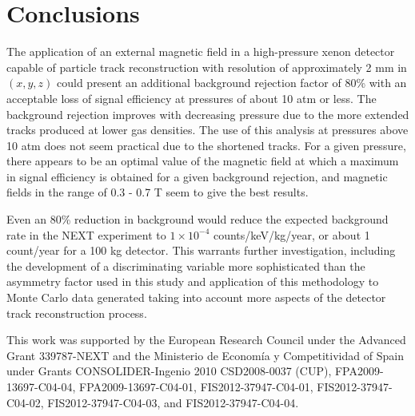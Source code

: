 \documentclass{JINST}
\begin{document}
\section{Conclusions}
The application of an external magnetic field in a high-pressure xenon detector capable of particle track reconstruction with resolution of approximately 2 mm in $(x,y,z)$ could present an additional background rejection factor of 80\% with an acceptable loss of signal efficiency at pressures of about 10 atm or less.  The background rejection improves with decreasing pressure due to the more extended tracks produced at lower gas densities.  The use of this analysis at pressures above 10 atm does not seem practical due to the shortened tracks.  For a given pressure, there appears to be an optimal value of the magnetic field at which a maximum in signal efficiency is obtained for a given background rejection, and magnetic fields in the range of 0.3 - 0.7 T seem to give the best results.

Even an 80\% reduction in background would reduce the expected background rate in the NEXT experiment to
$1 \times 10^{-4}$ counts/keV/kg/year, or about 1 count/year for a 100 kg detector.  This warrants further
investigation, including the development of a discriminating variable more sophisticated than the asymmetry factor
used in this study and application of this methodology to Monte Carlo data generated taking into account 
more aspects of the detector track reconstruction process.

\acknowledgments

This work was supported by the European Research Council under the Advanced Grant 339787-NEXT and the Ministerio de Econom\'{i}a y Competitividad of Spain under Grants CONSOLIDER-Ingenio 2010 CSD2008-0037 (CUP), FPA2009-13697-C04-04, FPA2009-13697-C04-01, FIS2012-37947-C04-01, FIS2012-37947-C04-02, FIS2012-37947-C04-03, and FIS2012-37947-C04-04.



\end{document}
